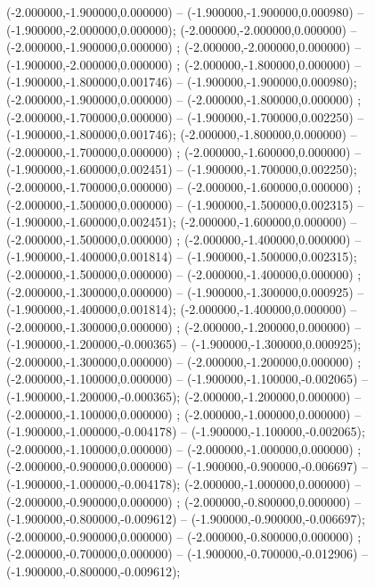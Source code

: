  (-2.000000,-1.900000,0.000000) -- (-1.900000,-1.900000,0.000980) -- (-1.900000,-2.000000,0.000000);
 (-2.000000,-2.000000,0.000000) -- (-2.000000,-1.900000,0.000000) ;
 (-2.000000,-2.000000,0.000000) -- (-1.900000,-2.000000,0.000000) ;
 (-2.000000,-1.800000,0.000000) -- (-1.900000,-1.800000,0.001746) -- (-1.900000,-1.900000,0.000980);
 (-2.000000,-1.900000,0.000000) -- (-2.000000,-1.800000,0.000000) ;
 (-2.000000,-1.700000,0.000000) -- (-1.900000,-1.700000,0.002250) -- (-1.900000,-1.800000,0.001746);
 (-2.000000,-1.800000,0.000000) -- (-2.000000,-1.700000,0.000000) ;
 (-2.000000,-1.600000,0.000000) -- (-1.900000,-1.600000,0.002451) -- (-1.900000,-1.700000,0.002250);
 (-2.000000,-1.700000,0.000000) -- (-2.000000,-1.600000,0.000000) ;
 (-2.000000,-1.500000,0.000000) -- (-1.900000,-1.500000,0.002315) -- (-1.900000,-1.600000,0.002451);
 (-2.000000,-1.600000,0.000000) -- (-2.000000,-1.500000,0.000000) ;
 (-2.000000,-1.400000,0.000000) -- (-1.900000,-1.400000,0.001814) -- (-1.900000,-1.500000,0.002315);
 (-2.000000,-1.500000,0.000000) -- (-2.000000,-1.400000,0.000000) ;
 (-2.000000,-1.300000,0.000000) -- (-1.900000,-1.300000,0.000925) -- (-1.900000,-1.400000,0.001814);
 (-2.000000,-1.400000,0.000000) -- (-2.000000,-1.300000,0.000000) ;
 (-2.000000,-1.200000,0.000000) -- (-1.900000,-1.200000,-0.000365) -- (-1.900000,-1.300000,0.000925);
 (-2.000000,-1.300000,0.000000) -- (-2.000000,-1.200000,0.000000) ;
 (-2.000000,-1.100000,0.000000) -- (-1.900000,-1.100000,-0.002065) -- (-1.900000,-1.200000,-0.000365);
 (-2.000000,-1.200000,0.000000) -- (-2.000000,-1.100000,0.000000) ;
 (-2.000000,-1.000000,0.000000) -- (-1.900000,-1.000000,-0.004178) -- (-1.900000,-1.100000,-0.002065);
 (-2.000000,-1.100000,0.000000) -- (-2.000000,-1.000000,0.000000) ;
 (-2.000000,-0.900000,0.000000) -- (-1.900000,-0.900000,-0.006697) -- (-1.900000,-1.000000,-0.004178);
 (-2.000000,-1.000000,0.000000) -- (-2.000000,-0.900000,0.000000) ;
 (-2.000000,-0.800000,0.000000) -- (-1.900000,-0.800000,-0.009612) -- (-1.900000,-0.900000,-0.006697);
 (-2.000000,-0.900000,0.000000) -- (-2.000000,-0.800000,0.000000) ;
 (-2.000000,-0.700000,0.000000) -- (-1.900000,-0.700000,-0.012906) -- (-1.900000,-0.800000,-0.009612);
